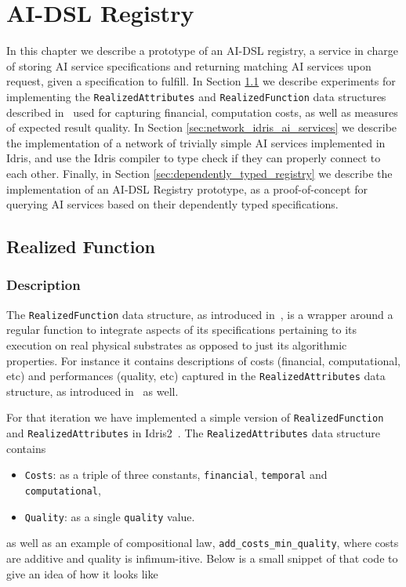 \documentclass[]{report}
\begin{document}
\chapter{AI-DSL Registry}
\label{chap:aidsl_registry}

In this chapter we describe a prototype of an AI-DSL registry, a
service in charge of storing AI service specifications and returning
matching AI services upon request, given a specification to fulfill.
In Section \ref{sec:realized_function} we describe experiments for
implementing the \texttt{RealizedAttributes} and
\texttt{RealizedFunction} data structures described
in~\cite{GoertzelGeisweillerBlog} used for capturing financial,
computation costs, as well as measures of expected result quality.  In
Section \ref{sec:network_idris_ai_services} we describe the implementation
of a network of trivially simple AI services implemented in Idris, and
use the Idris compiler to type check if they can properly connect to each
other.  Finally, in Section \ref{sec:dependently_typed_registry} we describe the
implementation of an AI-DSL Registry prototype, as a proof-of-concept
for querying AI services based on their dependently typed
specifications.

\section{Realized Function}
\label{sec:realized_function}

\subsection{Description}

The \texttt{RealizedFunction} data structure, as introduced
in~\cite{GoertzelGeisweillerBlog}, is a wrapper around a regular
function to integrate aspects of its specifications pertaining to its
execution on real physical substrates as opposed to just its
algorithmic properties.  For instance it contains descriptions of
costs (financial, computational, etc) and performances (quality, etc)
captured in the \texttt{RealizedAttributes} data structure, as
introduced in~\cite{GoertzelGeisweillerBlog} as well.

For that iteration we have implemented a simple version of
\texttt{RealizedFunction} and \texttt{RealizedAttributes} in
Idris2~\cite{Idris}.  The \texttt{RealizedAttributes} data structure
contains
\begin{itemize}
\item \texttt{Costs}: as a triple of three constants,
  \texttt{financial}, \texttt{temporal} and \texttt{computational},
\item \texttt{Quality}: as a single \texttt{quality} value.
\end{itemize}
as well as an example of compositional law,
\texttt{add\_costs\_min\_quality}, where costs are additive and
quality is infimum-itive.  Below is a small snippet of that code to
give an idea of how it looks like
\end{document}

